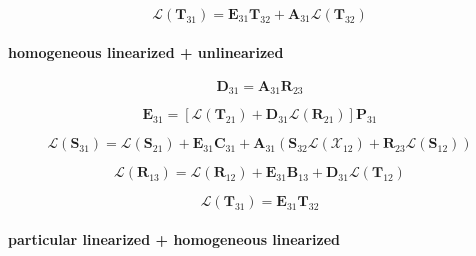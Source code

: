 \begin{equation}
\mathcal{L}(\mathbf{T}_{31}) = \mathbf{E}_{31}\mathbf{T}_{32} + \mathbf{A}_{31}\mathcal{L}(\mathbf{T}_{32})
\label{eq:adding-upward-tangent_linear-unlinearized_p_homogeneous_linearized-W31}
\end{equation}


\paragraph{homogeneous linearized + unlinearized}
\label{sec:adding-upward-tangent_linear-homogeneous_linearized_p_unlinearized}

\begin{equation}
\mathbf{D}_{31} = \mathbf{A}_{31}\mathbf{R}_{23}
\label{eq:adding-upward-tangent_linear-homogeneous_linearized_p_unlinearized-D31}
\end{equation}

\begin{equation}
\mathbf{E}_{31} = \left[\mathcal{L}(\mathbf{T}_{21}) + \mathbf{D}_{31}\mathcal{L}(\mathbf{R}_{21})\right]\mathbf{P}_{31}
\label{eq:adding-upward-tangent_linear-homogeneous_linearized_p_unlinearized-E31}
\end{equation}

\begin{equation}
\mathcal{L}(\mathbf{S}_{31}) = \mathcal{L}(\mathbf{S}_{21}) + \mathbf{E}_{31}\mathbf{C}_{31} + \mathbf{A}_{31}(\mathbf{S}_{32}\mathcal{L}(\mathcal{X}_{12}) + \mathbf{R}_{23}\mathcal{L}(\mathbf{S}_{12}))
\label{eq:adding-upward-tangent_linear-homogeneous_linearized_p_unlinearized-V31}
\end{equation}

\begin{equation}
\mathcal{L}(\mathbf{R}_{13}) = \mathcal{L}(\mathbf{R}_{12}) + \mathbf{E}_{31}\mathbf{B}_{13} + \mathbf{D}_{31}\mathcal{L}(\mathbf{T}_{12})
\label{eq:adding-upward-tangent_linear-homogeneous_linearized_p_unlinearized-U13}
\end{equation}

\begin{equation}
\mathcal{L}(\mathbf{T}_{31}) = \mathbf{E}_{31}\mathbf{T}_{32}
\label{eq:adding-upward-tangent_linear-homogeneous_linearized_p_unlinearized-W31}
\end{equation}


\paragraph{particular linearized + homogeneous linearized}
\label{sec:adding-upward-tangent_linear-particular_linearized_p_homogeneous_linearized}

